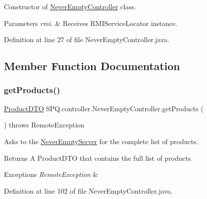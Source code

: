 Constructor of \mbox{\hyperlink{class_s_p_q_1_1controller_1_1_never_empty_controller}{Never\+Empty\+Controller}} class. 
\begin{DoxyParams}{Parameters}
{\em rmi.} & Receives R\+M\+I\+Service\+Locator instance. \\
\hline
\end{DoxyParams}


Definition at line 27 of file Never\+Empty\+Controller.\+java.



\subsection{Member Function Documentation}
\mbox{\label{class_s_p_q_1_1controller_1_1_never_empty_controller_ace99d4d39979b72d620871475a4817f9}} 
\subsubsection{\texorpdfstring{get\+Products()}{getProducts()}}
{\footnotesize\ttfamily \mbox{\hyperlink{class_s_p_q_1_1dto_1_1_product_d_t_o}{Product\+D\+TO}} S\+P\+Q.\+controller.\+Never\+Empty\+Controller.\+get\+Products (\begin{DoxyParamCaption}{ }\end{DoxyParamCaption}) throws Remote\+Exception}

Asks to the \mbox{\hyperlink{class_s_p_q_1_1_never_empty_server}{Never\+Empty\+Server}} for the complete list of products. \begin{DoxyReturn}{Returns}
A Product\+D\+TO that contains the full list of products. 
\end{DoxyReturn}

\begin{DoxyExceptions}{Exceptions}
{\em Remote\+Exception} & \\
\hline
\end{DoxyExceptions}


Definition at line 102 of file Never\+Empty\+Controller.\+java.

